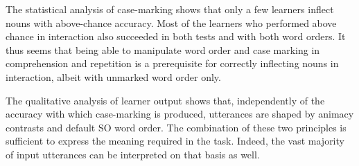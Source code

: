 The statistical analysis of case-marking shows that only a few learners inflect nouns with above-chance accuracy. Most of the learners who performed above chance in interaction also succeeded in both tests and with both word orders. It thus seems that being able to manipulate word order and case marking in comprehension and repetition is a prerequisite for correctly inflecting nouns in interaction, albeit with unmarked word order only.

The qualitative analysis of learner output shows that, independently of the accuracy with which case-marking is produced, utterances are shaped by animacy contrasts and default SO word order. The combination of these two principles is sufficient to express the meaning required in the task. Indeed, the vast majority of input utterances can be interpreted on that basis as well.
